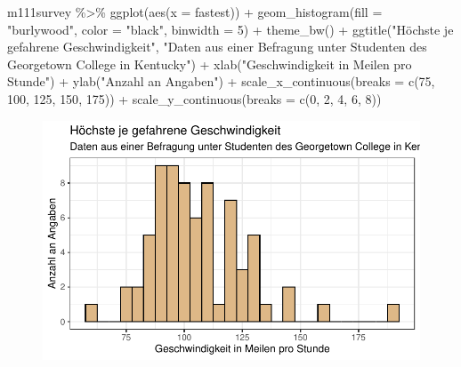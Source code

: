\documentclass[
  letterpaper,
  DIV=11,
  numbers=noendperiod]{scrartcl}
\newenvironment{Shaded}{\begin{snugshade}}{\end{snugshade}}
\newcommand{\AttributeTok}[1]{\textcolor[rgb]{0.40,0.45,0.13}{#1}}
\newcommand{\DecValTok}[1]{\textcolor[rgb]{0.68,0.00,0.00}{#1}}
\newcommand{\FunctionTok}[1]{\textcolor[rgb]{0.28,0.35,0.67}{#1}}
\newcommand{\NormalTok}[1]{\textcolor[rgb]{0.00,0.23,0.31}{#1}}
\newcommand{\SpecialCharTok}[1]{\textcolor[rgb]{0.37,0.37,0.37}{#1}}
\newcommand{\StringTok}[1]{\textcolor[rgb]{0.13,0.47,0.30}{#1}}
\begin{document}
\begin{Shaded}
\begin{Highlighting}[]
\NormalTok{m111survey }\SpecialCharTok{\%\textgreater{}\%} 
  \FunctionTok{ggplot}\NormalTok{(}\FunctionTok{aes}\NormalTok{(}\AttributeTok{x =}\NormalTok{ fastest)) }\SpecialCharTok{+}
  \FunctionTok{geom\_histogram}\NormalTok{(}\AttributeTok{fill =} \StringTok{"burlywood"}\NormalTok{, }\AttributeTok{color =} \StringTok{"black"}\NormalTok{, }\AttributeTok{binwidth =} \DecValTok{5}\NormalTok{) }\SpecialCharTok{+}
  \FunctionTok{theme\_bw}\NormalTok{() }\SpecialCharTok{+}
  \FunctionTok{ggtitle}\NormalTok{(}\StringTok{"Höchste je gefahrene Geschwindigkeit"}\NormalTok{,}
          \StringTok{"Daten aus einer Befragung unter Studenten des Georgetown College in Kentucky"}\NormalTok{) }\SpecialCharTok{+}
  \FunctionTok{xlab}\NormalTok{(}\StringTok{"Geschwindigkeit in Meilen pro Stunde"}\NormalTok{) }\SpecialCharTok{+}
  \FunctionTok{ylab}\NormalTok{(}\StringTok{"Anzahl an Angaben"}\NormalTok{) }\SpecialCharTok{+}
  \FunctionTok{scale\_x\_continuous}\NormalTok{(}\AttributeTok{breaks =} \FunctionTok{c}\NormalTok{(}\DecValTok{75}\NormalTok{, }\DecValTok{100}\NormalTok{, }\DecValTok{125}\NormalTok{, }\DecValTok{150}\NormalTok{, }\DecValTok{175}\NormalTok{)) }\SpecialCharTok{+}
  \FunctionTok{scale\_y\_continuous}\NormalTok{(}\AttributeTok{breaks =} \FunctionTok{c}\NormalTok{(}\DecValTok{0}\NormalTok{, }\DecValTok{2}\NormalTok{, }\DecValTok{4}\NormalTok{, }\DecValTok{6}\NormalTok{, }\DecValTok{8}\NormalTok{))}
\end{Highlighting}
\end{Shaded}

\begin{figure}[H]

{\centering \includegraphics{05-visualisierung_files/figure-pdf/unnamed-chunk-14-1.pdf}

}

\end{figure}
\end{document}
